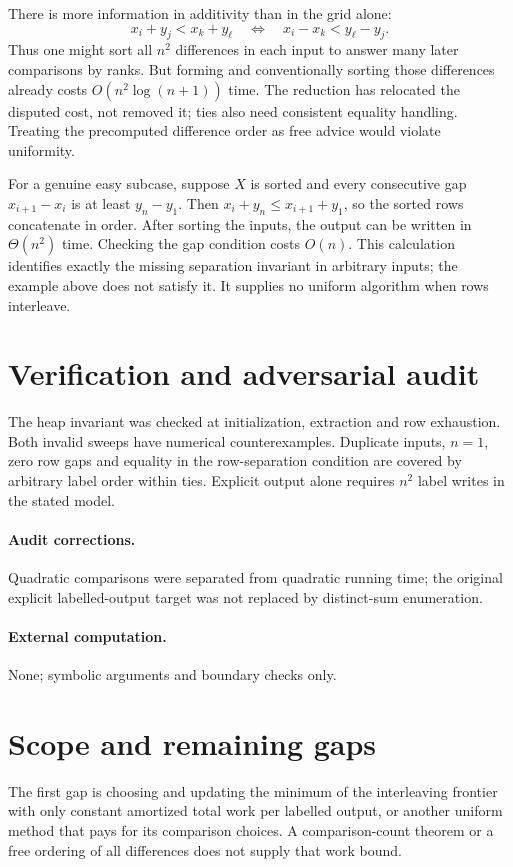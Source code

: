 \documentclass[11pt,a4paper]{article}
\begin{document}
There is more information in additivity than in the grid alone:
\[
 x_i+y_j<x_k+y_\ell\quad\Longleftrightarrow\quad
 x_i-x_k<y_\ell-y_j.
\]
Thus one might sort all $n^2$ differences in each input to answer many later
comparisons by ranks. But forming and conventionally sorting those differences
already costs $O(n^2\log(n+1))$ time. The reduction has relocated the disputed
cost, not removed it; ties also need consistent equality handling. Treating the
precomputed difference order as free advice would violate uniformity.

For a genuine easy subcase, suppose $X$ is sorted and every consecutive gap
$x_{i+1}-x_i$ is at least $y_n-y_1$. Then
$x_i+y_n\le x_{i+1}+y_1$, so the sorted rows concatenate in order. After sorting
the inputs, the output can be written in $\Theta(n^2)$ time. Checking the gap
condition costs $O(n)$. This calculation identifies exactly the missing
separation invariant in arbitrary inputs; the example above does not satisfy it.
It supplies no uniform algorithm when rows interleave.
\section{Verification and adversarial audit}
The heap invariant was checked at initialization, extraction and row
exhaustion. Both invalid sweeps have numerical counterexamples. Duplicate
inputs, $n=1$, zero row gaps and equality in the row-separation condition are
covered by arbitrary label order within ties. Explicit output alone requires
$n^2$ label writes in the stated model.
\paragraph{Audit corrections.} Quadratic comparisons were separated from quadratic running time; the original explicit labelled-output target was not replaced by distinct-sum enumeration.
\paragraph{External computation.} None; symbolic arguments and boundary checks only.
\section{Scope and remaining gaps}
The first gap is choosing and updating the minimum of the interleaving
frontier with only constant amortized total work per labelled output, or another
uniform method that pays for its comparison choices. A comparison-count theorem
or a free ordering of all differences does not supply that work bound.
\end{document}
